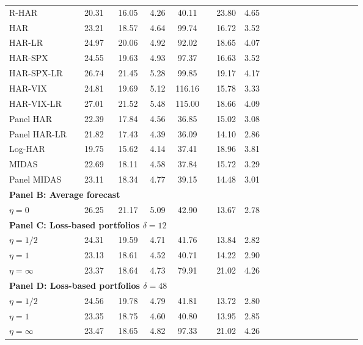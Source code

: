\begin{tabular}{lllccclccccccccccccc}
\midrule 
\multicolumn{2}{l}{R-HAR} & 20.31 & 16.05 & 4.26 & 40.11 & & 23.80 & 4.65\\ 
\multicolumn{2}{l}{HAR} & 23.21 & 18.57 & 4.64 & 99.74 & & 16.72 & 3.52\\ 
\multicolumn{2}{l}{HAR-LR} & 24.97 & 20.06 & 4.92 & 92.02 & & 18.65 & 4.07\\ 
\multicolumn{2}{l}{HAR-SPX} & 24.55 & 19.63 & 4.93 & 97.37 & & 16.63 & 3.52\\ 
\multicolumn{2}{l}{HAR-SPX-LR} & 26.74 & 21.45 & 5.28 & 99.85 & & 19.17 & 4.17\\ 
\multicolumn{2}{l}{HAR-VIX} & 24.81 & 19.69 & 5.12 & 116.16 & & 15.78 & 3.33\\ 
\multicolumn{2}{l}{HAR-VIX-LR} & 27.01 & 21.52 & 5.48 & 115.00 & & 18.66 & 4.09\\ 
\multicolumn{2}{l}{Panel HAR} & 22.39 & 17.84 & 4.56 & 36.85 & & 15.02 & 3.08\\ 
\multicolumn{2}{l}{Panel HAR-LR} & 21.82 & 17.43 & 4.39 & 36.09 & & 14.10 & 2.86\\ 
\midrule 
\multicolumn{2}{l}{Log-HAR} & 19.75 & 15.62 & 4.14 & 37.41 & & 18.96 & 3.81\\ 
\midrule 
\multicolumn{2}{l}{MIDAS} & 22.69 & 18.11 & 4.58 & 37.84 & & 15.72 & 3.29\\ 
\multicolumn{2}{l}{Panel MIDAS} & 23.11 & 18.34 & 4.77 & 39.15 & & 14.48 & 3.01\\ 
\midrule 
\multicolumn{5}{l}{\textbf{Panel B: Average forecast}} \\\midrule$\eta = 0$ &  & 26.25 & 21.17 & 5.09 & 42.90 & & 13.67 & 2.78\\ 
\midrule 
\multicolumn{5}{l}{\textbf{Panel C: Loss-based portfolios $\delta = 12$}} \\\midrule$\eta = 1/2$ &  & 24.31 & 19.59 & 4.71 & 41.76 & & 13.84 & 2.82\\ 
$\eta = 1$ &  & 23.13 & 18.61 & 4.52 & 40.71 & & 14.22 & 2.90\\ 
$\eta = \infty$ &  & 23.37 & 18.64 & 4.73 & 79.91 & & 21.02 & 4.26\\ 
\midrule\multicolumn{5}{l}{\textbf{Panel D: Loss-based portfolios $\delta = 48$}} \\\midrule$\eta = 1/2$ &  & 24.56 & 19.78 & 4.79 & 41.81 & & 13.72 & 2.80\\ 
$\eta = 1$ &  & 23.35 & 18.75 & 4.60 & 40.80 & & 13.95 & 2.85\\ 
$\eta = \infty$ &  & 23.47 & 18.65 & 4.82 & 97.33 & & 21.02 & 4.26\\ 
\bottomrule 
\end{tabular}